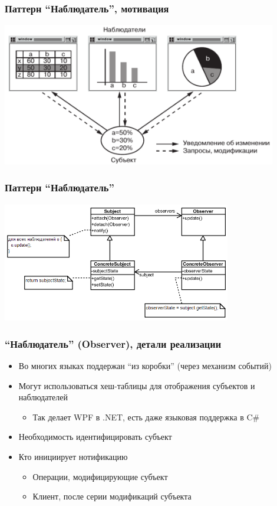 \documentclass{../../slides-style}
\begin{document}
    \begin{frame}
        \frametitle{Паттерн ``Наблюдатель'', мотивация}
        \begin{center}
            \includegraphics[width=0.9\textwidth]{observerExample.png}
        \end{center}
    \end{frame}

    \begin{frame}
        \frametitle{Паттерн ``Наблюдатель''}
        \begin{center}
            \includegraphics[width=0.75\textwidth]{observer.png}
        \end{center}
    \end{frame}

    \begin{frame}
        \frametitle{``Наблюдатель'' (Observer), детали реализации}
        \begin{itemize}
            \item Во многих языках поддержан ``из коробки'' (через механизм событий)
            \item Могут использоваться хеш-таблицы для отображения субъектов и наблюдателей
            \begin{itemize}
                \item Так делает WPF в .NET, есть даже языковая поддержка в C\#
            \end{itemize}
            \item Необходимость идентифицировать субъект
            \item Кто инициирует нотификацию
            \begin{itemize}
                \item Операции, модифицирующие субъект
                \item Клиент, после серии модификаций субъекта
            \end{itemize}
        \end{itemize}
    \end{frame}
\end{document}
